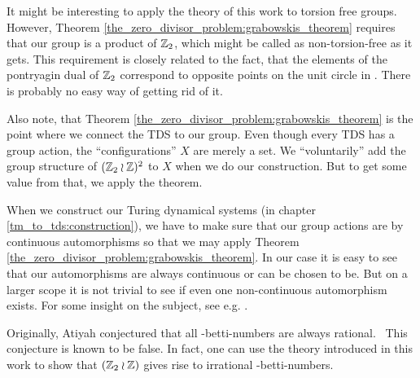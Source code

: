 \begin{Remark}
	\label{remarks:torsion_free_groups}
	It might be interesting to apply the theory of this work to torsion free groups.
	However, Theorem \ref{the_zero_divisor_problem:grabowskis_theorem} requires that our group is a product of $\mathbb{Z}_2$, which might be called as non-torsion-free as it gets.
	This requirement is closely related to the fact, that the elements of the pontryagin dual of $\mathbb{Z}_2$ correspond to opposite points on the unit circle in \C.
	There is probably no easy way of getting rid of it.

	Also note, that Theorem \ref{the_zero_divisor_problem:grabowskis_theorem} is the point where we connect the TDS to our group.
	Even though every TDS has a group action, the ``configurations'' $X$ are merely a set.
	We ``voluntarily'' add the group structure of $(\mathbb{Z}_2 \wr \mathbb{Z})^2$ to $X$ when we do our construction.
	But to get some value from that, we apply the theorem.
\end{Remark}

\begin{Remark}
	\label{remarks:continuous_group_automorphisms}
	When we construct our Turing dynamical systems (in chapter \ref{tm_to_tds:construction}), we have to make sure that our group actions are by continuous automorphisms so that we may apply Theorem \ref{the_zero_divisor_problem:grabowskis_theorem}.
	In our case it is easy to see that our automorphisms are always continuous or can be chosen to be.
	But on a larger scope it is not trivial to see if even one non-continuous automorphism exists. For some insight on the subject, see e.g. \cite{bhk16}.
\end{Remark}

\begin{Remark}
	\label{remarks:atiyah-conjecture}
	Originally, Atiyah conjectured that all \ltwo-betti-numbers are always rational.\footnotemark~
	This conjecture is known to be false.
	In fact, one can use the theory introduced in this work to show that $(\mathbb{Z}_2 \wr \mathbb{Z})$ gives rise to irrational \ltwo-betti-numbers.
\end{Remark}
